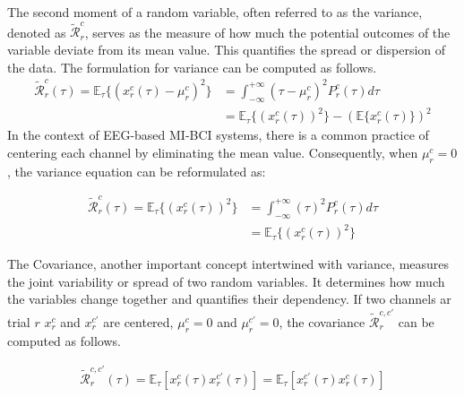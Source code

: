 \documentclass[runningheads]{llncs}
\newenvironment{reviewer}{\setcounter{pointcounter}{1}}{}
\newcommand{\changes}[1]{\textcolor[rgb]{1.00,0.00,0.00}{#1}}
\begin{document}
\begin{reviewer}
{        The second moment of a random variable, often referred to as the variance, denoted as \changes{$\mathcal{\tilde{R}}^{c}_{r}$}, serves as the measure of how much the potential outcomes of the variable deviate from its mean value. This quantifies the spread or dispersion of the data. The formulation for variance can be computed as follows.
        \changes{
        \begin{equation}
          \begin{split}
            \mathcal{\tilde{R}}^{c}_{r}(\tau) = \mathbb{E}_{\tau}\{(x^{c}_{r}(\tau) - \mu^{c}_{r})^2\} &= \int_{-\infty}^{+\infty} \left( \tau-\mu^{c}_{r} \right) ^2 P^{c}_{r}(\tau) d\tau \\
            &= \mathbb{E}_{\tau}\{(x^{c}_{r}(\tau))^2\} - (\mathbb{E}\{x^{c}_{r}(\tau)\})^2
          \end{split}
        \end{equation}
        }
        In the context of EEG-based MI-BCI systems, there is a common practice of centering each channel by eliminating the mean value. Consequently, when \changes{$\mu^{c}_{r}=0$}, the variance equation can be reformulated as:
        
        \changes{
        \begin{equation}
          \begin{split}
            \mathcal{\tilde{R}}^{c}_{r}(\tau) = \mathbb{E}_{\tau}\{(x^{c}_{r}(\tau))^2\} &= \int_{-\infty}^{+\infty}  (\tau)^2 P^{c}_{r}(\tau) d\tau \\
            &= \mathbb{E}_\tau\{(x^{c}_{r}(\tau))^2\}
          \end{split}
        \end{equation}
        }
        
        The Covariance, another important concept intertwined with variance, measures the joint variability or spread of two random variables. It determines how much the variables change together and quantifies their dependency. \changes{If two channels ar trial $r$ $x^{c}_{r}$ and $x^{c'}_{r}$ are centered, $\mu^{c}_{r}=0$ and $\mu^{c'}_{r}=0$, the covariance $\mathcal{\tilde{R}}^{c, c'}_{r}$} can be computed as follows.
        
        \changes{
        \begin{equation}
          \begin{split}
            \mathcal{\tilde{R}}^{c, c'}_{r}(\tau) = \mathbb{E}_{\tau} \left[ x^{c}_{r}(\tau) x^{c'}_{r}(\tau)  \right] = \mathbb{E}_{\tau} \left[ x^{c'}_{r}(\tau) x^{c}_{r}(\tau) \right]
          \end{split}
        \end{equation}
        }
        
}
\end{reviewer}
\end{document}
